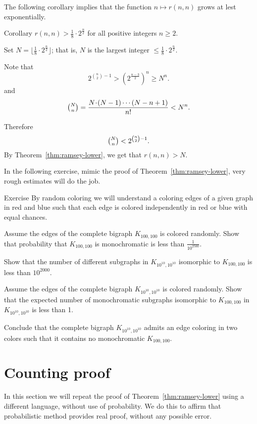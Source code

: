 The following corollary implies that the function $n\mapsto r(n,n)$ grows at lest exponentially. 

\begin{thm}{Corollary}
$r(n, n)> \tfrac1{8}\cdot 2^{\frac{n}{2}}$
for all positive integers $n\ge 2$.
\end{thm}

Set $N=\lfloor\tfrac1{8}\cdot 2^{\frac{n}{2}}\rfloor$;
that is, $N$ is the largest integer $\le\tfrac1{8}\cdot 2^{\frac{n}{2}}$.

Note that 
\[2^{\binom n 2 - 1}> (2^{\frac{n-3}2})^n\ge N^n.\]
and
\[\tbinom N n=\frac{N\cdot(N-1)\cdots (N-n+1)}{n!}<  N^n.\]

Therefore  
\[\tbinom N n<2^{\binom n 2 - 1}.\]
By Theorem~\ref{thm:ramsey-lower}, we get that $r(n,n)> N$.
\qeds

In the following exercise, mimic the proof of Theorem~\ref{thm:ramsey-lower}, very rough estimates will do the job.

\begin{thm}{Exercise}
By random coloring we will understand a coloring  edges of a given graph in red and blue such that each edge is colored independently in red or blue with equal chances. 

Assume the edges of the complete bigraph $K_{100,100}$ is colored randomly. 
Show that probability that $K_{100,100}$ is monochromatic is less than $\tfrac1{10^{2500}}$.

Show that the number of different subgraphs in  $K_{10^{10},10^{10}}$ isomorphic to $K_{100,100}$
is less than $10^{2000}$.

Assume the edges of the complete bigraph $K_{10^{10},10^{10}}$ is colored randomly. 
Show that the expected number of monochromatic subgraphs isomorphic to $K_{100,100}$ in $K_{10^{10},10^{10}}$ is less than 1.

Conclude that the complete bigraph $K_{10^{10},10^{10}}$ admits an edge coloring in two colors such that it contains no monochromatic $K_{100,100}$. 
\end{thm}

\section*{Counting proof}

In this section we will repeat the proof of Theorem~\ref{thm:ramsey-lower} using a different language, without use of probability.
We do this to affirm that probabilistic method provides real proof, without any possible error.

